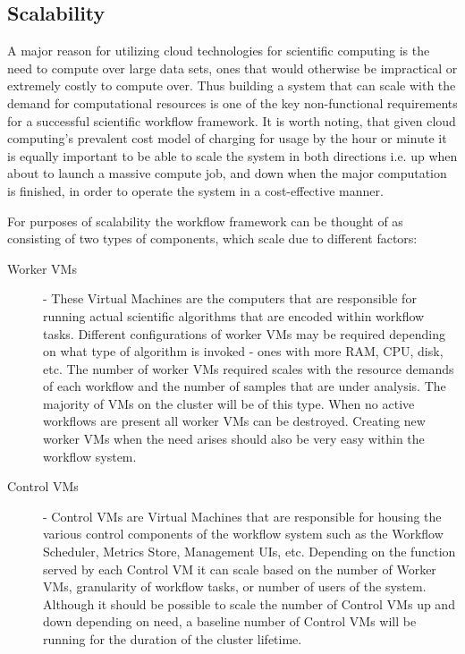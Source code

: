 \subsection {Scalability} \label{sec:scalability}

A major reason for utilizing cloud technologies for scientific computing is the need to compute over large data sets, ones that would otherwise be impractical or extremely costly to compute over. Thus building a system that can scale with the demand for computational resources is one of the key non-functional requirements for a successful scientific workflow framework. It is worth noting, that given cloud computing's prevalent cost model of charging for usage by the hour or minute it is equally important to be able to scale the system in both directions i.e. up when about to launch a massive compute job, and down when the major computation is finished, in order to operate the system in a cost-effective manner.

For purposes of scalability the workflow framework can be thought of as consisting of two types of components, which scale due to different factors:

\begin{description}
\item [Worker VMs] - These Virtual Machines are the computers that are responsible for running actual scientific algorithms that are encoded within workflow tasks. Different configurations of worker VMs may be required depending on what type of algorithm is invoked - ones with more RAM, CPU, disk, etc. The number of worker VMs required scales with the resource demands of each workflow and the number of samples that are under analysis. The majority of VMs on the cluster will be of this type. When no active workflows are present all worker VMs can be destroyed. Creating new worker VMs when the need arises should also be very easy within the workflow system.
    
\item [Control VMs] - Control VMs are Virtual Machines that are responsible for housing the various control components of the workflow system such as the Workflow Scheduler, Metrics Store, Management UIs, etc. Depending on the function served by each Control VM it can scale based on the number of Worker VMs, granularity of workflow tasks, or number of users of the system. Although it should be possible to scale the number of Control VMs up and down depending on need, a baseline number of Control VMs will be running for the duration of the cluster lifetime.
\end{description}

